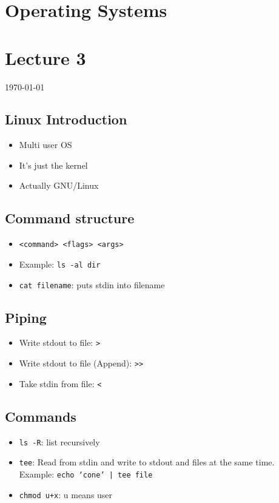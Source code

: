 \documentclass[12pt]{article}
\begin{document}
{\centering
\section*{Operating Systems}
\section*{Lecture 3}
\indent\today
}

\subsection*{Linux Introduction}
\begin{itemize}
    \item Multi user OS
    \item It's just the kernel
    \item Actually GNU/Linux
\end{itemize}
\subsection*{Command structure}
\begin{itemize}
    \item \texttt{<command> <flags> <args>}
    \item Example: \texttt{ls -al dir}
    \item \texttt{cat filename}: puts stdin into filename
\end{itemize}
\subsection*{Piping}
\begin{itemize}
    \item Write stdout to file: \texttt{>}
    \item Write stdout to file (Append): \texttt{>>}
    \item Take stdin from file: \texttt{<}
\end{itemize}
\subsection*{Commands}
\begin{itemize}
    \item \texttt{ls -R}: list recursively
    \item \texttt{tee}: Read from stdin and write to stdout and files at the same time. Example: \texttt{echo `cone' | tee file}
    \item \texttt{chmod u+x}: u means user
\end{itemize}
\end{document}
